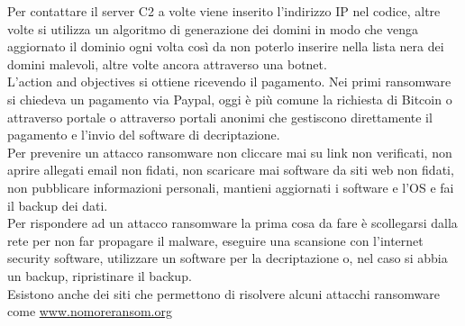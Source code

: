 Per contattare il server \acrshort{C2} a volte viene inserito l'indirizzo IP nel codice, altre volte si utilizza un algoritmo di generazione dei domini in modo che venga aggiornato il dominio ogni volta così da non poterlo inserire nella lista nera dei domini malevoli, altre volte ancora attraverso una botnet.\\
L'action and objectives si ottiene ricevendo il pagamento.
Nei primi ransomware si chiedeva un pagamento via Paypal, oggi è più comune la richiesta di Bitcoin o attraverso portale o attraverso portali anonimi che gestiscono direttamente il pagamento e l'invio del software di decriptazione.\\
Per prevenire un attacco ransomware non cliccare mai su link non verificati, non aprire allegati email non fidati, non scaricare mai software da siti web non fidati, non pubblicare informazioni personali, mantieni aggiornati i software e l'\acrshort{OS} e fai il backup dei dati.\\
Per rispondere ad un attacco ransomware la prima cosa da fare è scollegarsi dalla rete per non far propagare il malware, eseguire una scansione con l'internet security software, utilizzare un software per la decriptazione o, nel caso si abbia un backup, ripristinare il backup.\\
Esistono anche dei siti che permettono di risolvere alcuni attacchi ransomware come \url{www.nomoreransom.org}